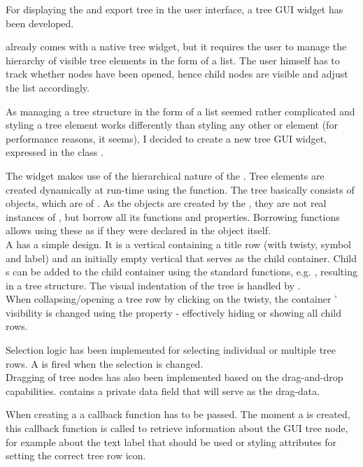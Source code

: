 For displaying the  and export tree in the user interface, a tree GUI widget has been developed.

 already comes with a native tree widget, but it requires the user to manage the hierarchy of visible tree elements in the form of a list. The user himself has to track whether nodes have been opened, hence child nodes are visible and adjust the list accordingly.

As managing a tree structure in the form of a list seemed rather complicated and styling a  tree element works differently than styling any other  or  element (for performance reasons, it seems), I decided to create a new tree GUI widget, expressed in the class .

The widget makes use of the hierarchical nature of the  . Tree elements are created dynamically at run-time using the \linebreak{} function. The tree basically consists of   objects, which are  of . As the  objects are created by the , they are not real instances of , but borrow all its functions and properties. Borrowing functions allows using these as if they were declared in the object itself.\\
A  has a simple design. It is a vertical  containing a title row (with twisty, symbol and label) and an initially empty vertical  that serves as the child container. Child s can be added to the child container using the standard  functions, e.g. , resulting in a tree structure. The visual indentation of the tree is handled by .\\
When collapsing/opening a tree row by clicking on the twisty, the container ' visibility is changed using the   property - effectively hiding or showing all child rows.

Selection logic has been implemented for selecting individual or multiple tree rows. A   is fired when the selection is changed.\\
Dragging of tree nodes has also been implemented based on the  drag-and-drop capabilities.  contains a private data field that will serve as the drag-data.

When creating a  a callback function has to be passed. The moment a  is created, this callback function is called to retrieve information about the GUI tree node, for example about the text label that should be used or styling attributes for setting the correct tree row icon.


